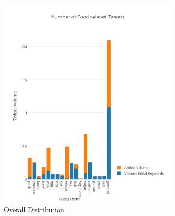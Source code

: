\documentclass[12pt]{report}
\begin{document}
\begin{figure}
        \centering
        \begin{subfigure}[b]{0.5\textwidth}
                \includegraphics[width=\textwidth]{img/anal/exp_dist}
                \caption{Overall Distribution}
                \label{fig:world}
        \end{subfigure}%
        ~ %
        \begin{subfigure}[b]{0.5\textwidth}

\end{subfigure}
\end{figure}
\end{document}

